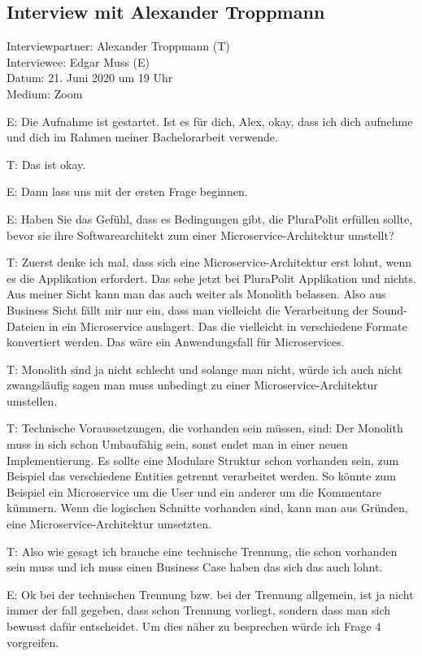 \subsection{Interview mit Alexander Troppmann}
\label{appendix:troppmann}

Interviewpartner: Alexander Troppmann (T) \\
Interviewee: Edgar Muss (E) \\
Datum: 21. Juni 2020 um 19 Uhr \\
Medium: Zoom

E: Die Aufnahme ist gestartet. Ist es für dich, Alex, okay, dass ich dich aufnehme und dich im Rahmen meiner Bachelorarbeit verwende.

T: Das ist okay.

E: Dann lass uns mit der ersten Frage beginnen.

E: Haben Sie das Gefühl, dass es Bedingungen gibt, die PluraPolit erfüllen sollte, bevor sie ihre Softwarearchitekt zum einer Microservice-Architektur umstellt? 

T: Zuerst denke ich mal, dass sich eine Microservice-Architektur erst lohnt, wenn es die Applikation erfordert. Das sehe jetzt bei PluraPolit Applikation und nichts. Aus meiner Sicht kann man das auch weiter als Monolith belassen.  Also aus Business Sicht fällt mir nur ein,  dass man vielleicht die Verarbeitung der Sound-Dateien in ein Microservice auslagert. Das die vielleicht in verschiedene Formate konvertiert werden. Das wäre ein Anwendungsfall für Microservices. 

T: Monolith sind ja nicht schlecht und solange man nicht, würde ich auch nicht zwangsläufig sagen man muss unbedingt zu einer Microservice-Architektur umstellen.

T: Technische Voraussetzungen, die vorhanden sein müssen, sind: Der Monolith muss in sich schon Umbaufähig sein, sonst endet man in einer neuen Implementierung. Es sollte eine Modulare Struktur schon vorhanden sein, zum Beispiel das verschiedene Entities getrennt verarbeitet werden. So könnte zum Beispiel ein Microservice um die User und ein anderer um  die Kommentare kümmern. Wenn die logischen Schnitte vorhanden sind, kann man aus Gründen, eine Microservice-Architektur umsetzten. 

\label{appendix:t-1} \label{appendix:t-2}
T: Also wie gesagt ich brauche eine technische Trennung, die schon vorhanden sein muss und ich muss einen Business Case haben das sich das auch lohnt.

E: Ok bei der technischen Trennung bzw. bei der Trennung allgemein, ist ja nicht immer der fall gegeben, dass schon Trennung vorliegt, sondern dass man sich bewusst dafür entscheidet. Um dies näher zu besprechen würde ich Frage 4 vorgreifen.

